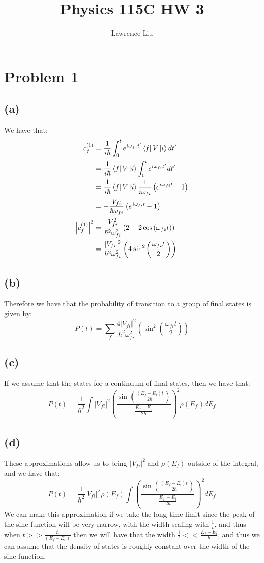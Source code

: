 \documentclass[11pt]{article}
\author{Lawrence Liu}
\title{Physics 115C HW 3}
\begin{document}
\maketitle
\section*{Problem 1}
\subsection*{(a)}
We have that:
\begin{align*}
    c_{f}^{(1)} &= \frac{1}{i\hbar}\int_{0}^{t} e^{i\omega_{fi}t'}\bra{f}V\ket{i}dt'\\
    &= \frac{1}{i\hbar}\bra{f}V\ket{i}\int_{0}^{t} e^{i\omega_{fi}t'}dt'\\
    &= \frac{1}{i\hbar}\bra{f}V\ket{i}\frac{1}{i\omega_{fi}}\left(e^{i\omega_{fi}t}-1\right)\\
    &= -\frac{V_{fi}}{\hbar\omega_{fi}}\left(e^{i\omega_{fi}t}-1\right)\\
    \left|c_{f}^{(1)}\right|^2 &= \frac{V_{fi}^2}{\hbar^2\omega_{fi}^2}\left(2-2\cos\left(\omega_{fi}t\right)\right)\\
    &= \frac{|V_{fi}|^2}{\hbar^2\omega_{fi}^2}\left(4\sin^2\left(\frac{\omega_{fi}t}{2}\right)\right)\\
\end{align*}
\subsection*{(b)}
Therefore we have that the probability of transition to a group of final states is given by:
$$P(t) = \sum_{f} \frac{4|V_{fi}|^2}{\hbar^2\omega_{fi}^2}\left(\sin^2\left(\frac{\omega_{fi}t}{2}\right)\right)$$
\subsection*{(c)}
If we assume that the states for a continuum of final states, then we have that:
$$P(t) = \frac{1}{\hbar^2}\int |V_{fi}|^2\left(\frac{\sin\left(\frac{(E_{f}-E_i)t}{2\hbar}\right)}{\frac{E_f-E_i}{2\hbar}}\right)^2\rho(E_f)dE_f$$
\subsection*{(d)}
These approximations allow us to bring $|V_{fi}|^2$ and $\rho(E_f)$ outside of the integral, and we have that:
$$P(t) = \frac{1}{\hbar^2}|V_{fi}|^2\rho(E_f)\int \left(\frac{\sin\left(\frac{(E_{f}-E_i)t}{2\hbar}\right)}{\frac{E_f-E_i}{2\hbar}}\right)^2dE_f$$
We can make this approximation if we take the long time limit since the peak of the sinc function will be very narrow, with the 
width scaling with $\frac{1}{t}$, and thus when $t>>\frac{\hbar}{(E_{f}-E_i)}$ then we will have that the width $\frac{1}{t}<<\frac{E_f-E_i}{\hbar}$,
and thus we can assume that the density of states is roughly constant over the width of the sinc function.
\end{document}
